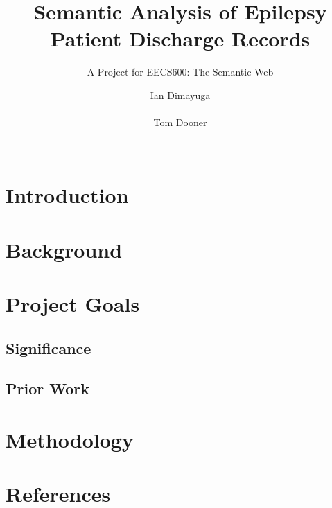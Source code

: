 \documentclass{acm_proc_article-sp}
\begin{document}
\title{Semantic Analysis of Epilepsy Patient Discharge Records}
\subtitle{A Project for EECS600: The Semantic Web}
\author{
\alignauthor Ian Dimayuga \\
    \\
\alignauthor Tom Dooner \\
    \\
}
\maketitle
\begin{abstract}
\end{abstract}

\section{Introduction}
\section{Background}

\section{Project Goals}
\subsection{Significance}
\subsection{Prior Work}

\section{Methodology}

\section{References}
\end{document}

